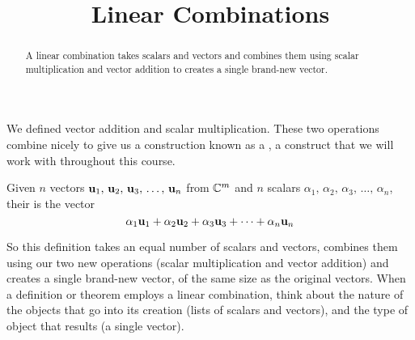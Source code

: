 \documentclass{ximera}
\title{Linear Combinations}
\begin{document}
\begin{abstract}
  A linear combination takes scalars and vectors and combines them
  using scalar multiplication and vector addition to creates a single
  brand-new vector.
\end{abstract}
\maketitle

We defined vector addition and scalar multiplication.  These two
operations combine nicely to give us a construction known as a
, a construct that we will work with
throughout this course.

\begin{definition}
  Given $n$ vectors $\mathbf{u}_{1},\,\mathbf{u}_{2},\,\mathbf{u}_{3},\,\ldots,\,\mathbf{u}_{n}$ from $\mathbb{C}^{m}$ and $n$
  scalars $\alpha_1,\,\alpha_2,\,\alpha_3,\,\ldots,\,\alpha_n$, their
   is the vector
  \[
    \alpha_{1}\mathbf{u}_{1}+\alpha_{2}\mathbf{u}_{2}+\alpha_{3}\mathbf{u}_{3}+\cdots +\alpha_{n}\mathbf{u}_{n}
  \]
\end{definition}

So this definition takes an equal number of scalars and vectors,
combines them using our two new operations (scalar multiplication and
vector addition) and creates a single brand-new vector, of the same
size as the original vectors.  When a definition or theorem employs a
linear combination, think about the nature of the objects that go into
its creation (lists of scalars and vectors), and the type of object
that results (a single vector).
\end{document}
